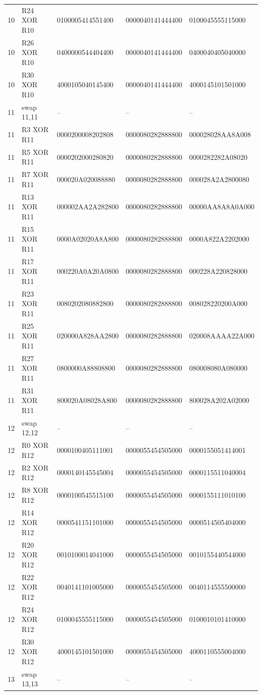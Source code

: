 \begin{longtable}{rllll}
10 & R24 XOR R10 & 0100005414551400 & 0000040141444400 & 0100045555115000\\
10 & R26 XOR R10 & 0400000544404400 & 0000040141444400 & 0400040405040000\\
10 & R30 XOR R10 & 4000105040145400 & 0000040141444400 & 4000145101501000\\
11 & swap 11,11 & -- & -- & --\\
11 & R3 XOR R11 & 0000200008202808 & 0000080282888800 & 000028028AA8A008\\
11 & R5 XOR R11 & 0000202000280820 & 0000080282888800 & 0000282282A08020\\
11 & R7 XOR R11 & 000020A020088880 & 0000080282888800 & 000028A2A2800080\\
11 & R13 XOR R11 & 000002AA2A282800 & 0000080282888800 & 00000AA8A8A0A000\\
11 & R15 XOR R11 & 0000A02020A8A800 & 0000080282888800 & 0000A822A2202000\\
11 & R17 XOR R11 & 000220A0A20A0800 & 0000080282888800 & 000228A220828000\\
11 & R23 XOR R11 & 0080202080882800 & 0000080282888800 & 008028220200A000\\
11 & R25 XOR R11 & 020000A828AA2800 & 0000080282888800 & 020008AAAA22A000\\
11 & R27 XOR R11 & 0800000A88808800 & 0000080282888800 & 080008080A080000\\
11 & R31 XOR R11 & 800020A08028A800 & 0000080282888800 & 800028A202A02000\\
12 & swap 12,12 & -- & -- & --\\
12 & R0 XOR R12 & 0000100405111001 & 0000055454505000 & 0000155051414001\\
12 & R2 XOR R12 & 0000140145545004 & 0000055454505000 & 0000115511040004\\
12 & R8 XOR R12 & 0000100545515100 & 0000055454505000 & 0000155111010100\\
12 & R14 XOR R12 & 0000541151101000 & 0000055454505000 & 0000514505404000\\
12 & R20 XOR R12 & 0010100014041000 & 0000055454505000 & 0010155440544000\\
12 & R22 XOR R12 & 0040141101005000 & 0000055454505000 & 0040114555500000\\
12 & R24 XOR R12 & 0100045555115000 & 0000055454505000 & 0100010101410000\\
12 & R30 XOR R12 & 4000145101501000 & 0000055454505000 & 4000110555004000\\
13 & swap 13,13 & -- & -- & --\\

\end{longtable}
